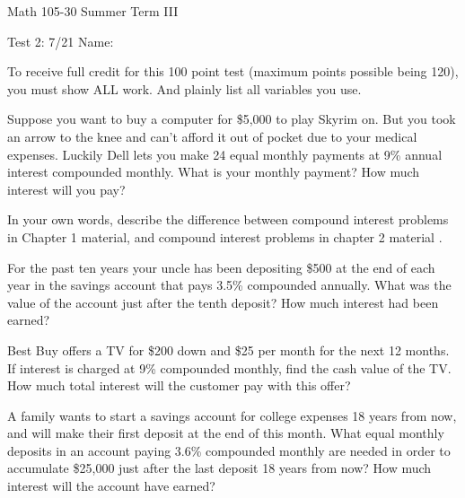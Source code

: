 \documentclass[11pt,epsfig]{article}
\begin{document}
Math 105-30 Summer Term III 

Test 2: 7/21 \hspace{1.9in} {Name:} {\underline {\hspace{3.5in}}}
\vspace{2pc}

To receive full credit for this 100 point test (maximum points possible being 120), you must show ALL work. And plainly list all variables you use.
\vspace{2pc}



\begin{problem}{12}
Suppose you want to buy a computer for \$5,000 to play Skyrim on. But you took an arrow to the knee and can't afford it out of pocket due to your medical expenses. Luckily Dell lets you make 24 equal monthly payments at 9\% annual interest compounded monthly. What is your monthly payment? How much interest will you pay?

\vfill
\end{problem}

\begin{problem}{12}
In your own words, describe the difference between compound interest problems in Chapter 1 material, and compound interest problems in chapter 2 material .

\vfill
\end{problem}

\begin{problem}{12}
For the past ten years your uncle has been depositing \$500 at the end of each year in the savings account that pays 3.5\% compounded annually. What was the value of the account just after the tenth deposit? How much interest had been earned?

\vfill
\end{problem}

\newpage

\begin{problem}{12}
Best Buy offers a TV for \$200 down and \$25 per month for the next 12 months. If interest is charged at 9\% compounded monthly, find the cash value of the TV. How much total interest will the customer pay with this offer?

\vfill
\end{problem}

\begin{problem}{12}
A family wants to start a savings account for college expenses 18 years from now, and will make their first deposit at the end of this month. What equal monthly deposits in an account paying 3.6\% compounded monthly are needed in order to accumulate \$25,000 just after the last deposit 18 years from now? How much interest will the account have earned?  

\vfill
\end{problem}
\end{document}
